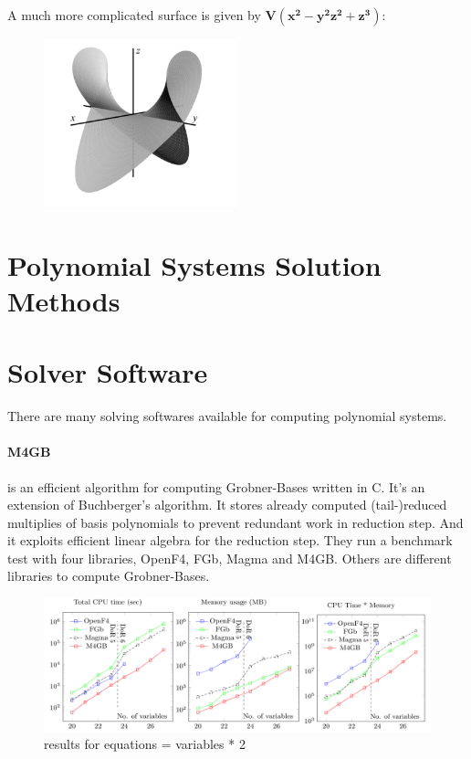 \documentclass[11pt]{article}
\begin{document}
A much more complicated surface is given by $\mathbf{V(x^2 - y^2z^2 + z^3)}$:

\begin{figure}[H]
  \begin{center}
    \includegraphics[width=0.50\textwidth]{complicated.png}
    \caption{}
    \label{fig: }
  \end{center}
\end{figure}

\section{Polynomial Systems Solution Methods}


\section{Solver Software}
There are many solving softwares available for computing polynomial systems.
\paragraph{M4GB}\cite{m4gbarticle}
is an  efficient algorithm for computing Grobner-Bases written in C. It's an extension of Buchberger’s algorithm. It stores already computed (tail-)reduced multiplies of basis polynomials to prevent redundant work in reduction step. And it exploits efficient linear algebra for the reduction step.
They run a benchmark test with four libraries, OpenF4, FGb, Magma and M4GB. Others are different libraries to compute Grobner-Bases.
\begin{figure}[H]
  \begin{center}
    \includegraphics[width=\linewidth]{m4gb_m_2n.png}
    \caption{results for equations = variables * 2}
    \label{fig:m4gb_m_2n}
  \end{center}
\end{figure}
\end{document}
